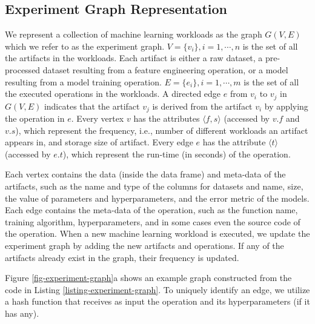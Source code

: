 \subsection{Experiment Graph Representation}\label{sub-graph-construction}
We represent a collection of machine learning workloads as the graph $G(V, E)$ which we refer to as the experiment graph.
$V=\{v_i\}, i = 1, \cdots, n$ is the set of all the artifacts in the workloads.
Each artifact is either a raw dataset, a pre-processed dataset resulting from a feature engineering operation, or a model resulting from a model training operation.
$E=\{e_i\}, i = 1, \cdots, m$ is the set of all the executed operations in the workloads.
A directed edge $e$ from $v_i$ to $v_j$ in $G(V, E)$ indicates that the artifact $v_j$ is derived from the artifact $v_i$ by applying the operation in $e$.
Every vertex $v$ has the attributes $\langle f, s \rangle$ (accessed by $v.f$ and $v.s$), which represent the  frequency, i.e., number of different workloads an artifact appears in, and storage size of artifact.
Every edge $e$ has the attribute $\langle t \rangle$ (accessed by $e.t$), which represent the run-time (in seconds) of the operation.


Each vertex contains the data (inside the data frame) and meta-data of the artifacts, such as the name and type of the columns for datasets and name, size, the value of parameters and hyperparameters, and the error metric of the models.
Each edge contains the meta-data of the operation, such as the function name, training algorithm, hyperparameters, and in some cases even the source code of the operation.
When a new machine learning workload is executed, we update the experiment graph by adding the new artifacts and operations.
If any of the artifacts already exist in the graph, their frequency is updated.

Figure \ref{fig-experiment-graph}a shows an example graph constructed from the code in Listing \ref{listing-experiment-graph}.
To uniquely identify an edge, we utilize a hash function that receives as input the operation and its hyperparameters (if it has any).

